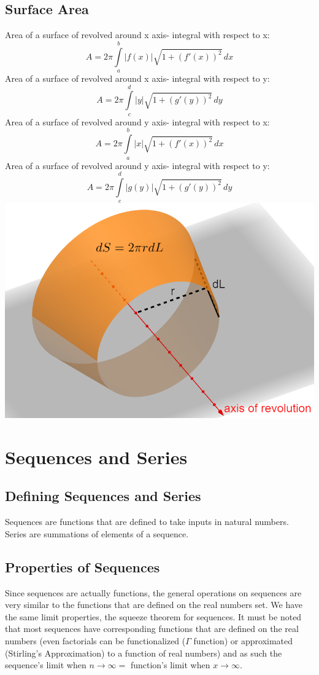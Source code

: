 \documentclass[12pt]{article}
\begin{document}
\subsection{Surface Area}
Area of a surface of revolved around x axis- integral with respect to x: $$A=2\pi \int \limits_a^b |f(x)|\sqrt{1+(f'(x))^2} \,dx$$
Area of a surface of revolved around x axis- integral with respect to y: $$A=2\pi \int \limits_c^d |y|\sqrt{1+(g'(y))^2} \,dy$$
Area of a surface of revolved around y axis- integral with respect to x: $$A=2\pi \int \limits_a^b |x|\sqrt{1+(f'(x))^2} \,dx$$
Area of a surface of revolved around y axis- integral with respect to y: $$A=2\pi \int \limits_c^d |g(y)|\sqrt{1+(g'(y))^2} \,dy$$
\includegraphics[scale=0.40]{surfacearea.png}
\section{Sequences and Series}
\subsection{Defining Sequences and Series}
Sequences are functions that are defined to take inputs in natural numbers.\\
Series are summations of elements of a sequence.
\subsection{Properties of Sequences}
Since sequences are actually functions, the general operations on sequences are very similar to the functions that are defined on the real numbers set. We have the same limit properties, the squeeze theorem for sequences. It must be noted that most sequences have corresponding functions that are defined on the real numbers (even factorials can be functionalized ($\Gamma$ function) or approximated (Stirling's Approximation) to a function of real numbers) and as such the sequence's limit when $n \to \infty =$ function's limit when $x \to \infty$.
\end{document}
